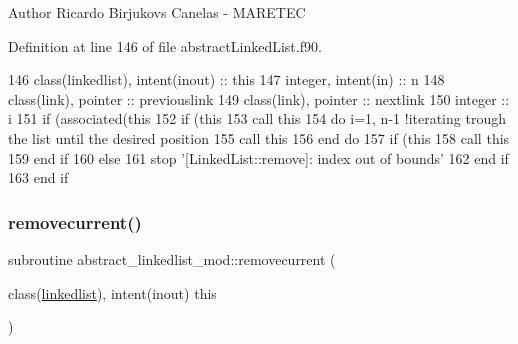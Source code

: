 \begin{DoxyAuthor}{Author}
Ricardo Birjukovs Canelas -\/ M\+A\+R\+E\+T\+EC 
\end{DoxyAuthor}


Definition at line 146 of file abstract\+Linked\+List.\+f90.


\begin{DoxyCode}
146     \textcolor{keywordtype}{class}(linkedlist), \textcolor{keywordtype}{intent(inout)} :: this
147     \textcolor{keywordtype}{integer}, \textcolor{keywordtype}{intent(in)} :: n
148     \textcolor{keywordtype}{class}(link), \textcolor{keywordtype}{pointer} :: previouslink
149     \textcolor{keywordtype}{class}(link), \textcolor{keywordtype}{pointer} :: nextlink
150     \textcolor{keywordtype}{integer} :: i
151     \textcolor{keywordflow}{if} (\textcolor{keyword}{associated}(this%
152         \textcolor{keywordflow}{if} (this%
153             \textcolor{keyword}{call }this%
154             \textcolor{keywordflow}{do} i=1, n-1    \textcolor{comment}{!iterating trough the list until the desired position}
155                 \textcolor{keyword}{call }this%
156 \textcolor{keywordflow}{            end do}
157             \textcolor{keywordflow}{if} (this%
158                 \textcolor{keyword}{call }this%
159 \textcolor{keywordflow}{            end if}
160         \textcolor{keywordflow}{else}
161             stop \textcolor{stringliteral}{'[LinkedList::remove]: index out of bounds'}
162 \textcolor{keywordflow}{        end if}
163 \textcolor{keywordflow}{    end if}
\end{DoxyCode}
\mbox{\label{namespaceabstract__linkedlist__mod_ae725ed63dd3b08d29e1c4ff824e05589}} 
\subsubsection{\texorpdfstring{removecurrent()}{removecurrent()}}
{\footnotesize\ttfamily subroutine abstract\+\_\+linkedlist\+\_\+mod\+::removecurrent (\begin{DoxyParamCaption}\item[{class(\mbox{\hyperlink{structabstract__linkedlist__mod_1_1linkedlist}{linkedlist}}), intent(inout)}]{this }\end{DoxyParamCaption})\hspace{0.3cm}{\ttfamily [private]}}



